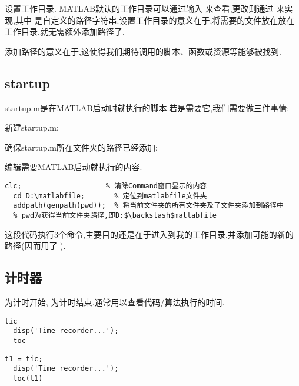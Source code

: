 \item 设置工作目录. MATLAB默认的工作目录可以通过输入  来查看,更改则通过  来实现,其中  是自定义的路径字符串.设置工作目录的意义在于,将需要的文件放在放在工作目录,就无需额外添加路径了.

\myenddot

添加路径的意义在于,这使得我们期待调用的脚本、函数或资源等能够被找到.




\subsection{startup}
startup.m是在MATLAB启动时就执行的脚本.若是需要它,我们需要做三件事情:
\begindot
  \item 新建startup.m;
  \item 确保startup.m所在文件夹的路径已经添加;
  \item 编辑需要MATLAB启动就执行的内容.
\myenddot

\vspace{-0.8cm}
\begin{lstlisting}[caption = 我的startup.m]
  clc;                    % 清除Command窗口显示的内容
  cd D:\matlabfile;       % 定位到matlabfile文件夹
  addpath(genpath(pwd));  % 将当前文件夹的所有文件夹及子文件夹添加到路径中
  % pwd为获得当前文件夹路径,即D:$\backslash$matlabfile
\end{lstlisting}
这段代码执行3个命令,主要目的还是在于进入到我的工作目录,并添加可能的新的路径(因而用了 ).



\subsection{计时器}
 为计时开始,  为计时结束.通常用以查看代码/算法执行的时间.

\vspace{-0.8cm}
\begin{lstlisting}[caption = 计时1]
  tic
  disp('Time recorder...');
  toc
\end{lstlisting}

\vspace{-0.8cm}
\begin{lstlisting}[caption=计时2]
  t1 = tic;
  disp('Time recorder...');
  toc(t1)
\end{lstlisting}


